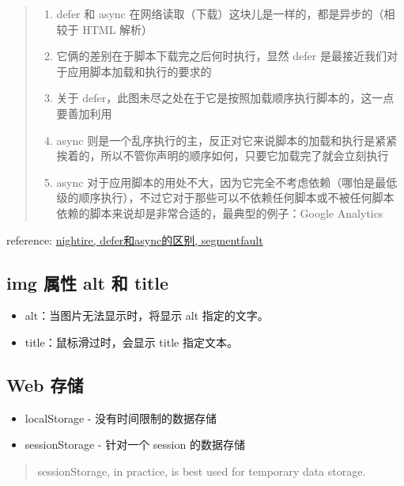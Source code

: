 \begin{quote}
\begin{enumerate}
\def\labelenumi{\arabic{enumi}.}
\tightlist
\item
  defer 和 async 在网络读取（下载）这块儿是一样的，都是异步的（相较于
  HTML 解析）
\item
  它俩的差别在于脚本下载完之后何时执行，显然 defer
  是最接近我们对于应用脚本加载和执行的要求的
\item
  关于
  defer，此图未尽之处在于它是按照加载顺序执行脚本的，这一点要善加利用
\item
  async
  则是一个乱序执行的主，反正对它来说脚本的加载和执行是紧紧挨着的，所以不管你声明的顺序如何，只要它加载完了就会立刻执行
\item
  async
  对于应用脚本的用处不大，因为它完全不考虑依赖（哪怕是最低级的顺序执行），不过它对于那些可以不依赖任何脚本或不被任何脚本依赖的脚本来说却是非常合适的，最典型的例子：Google
  Analytics
\end{enumerate}
\end{quote}

reference:
\href{http://segmentfault.com/q/1010000000640869/a-1020000000641029}{nightire,
defer和async的区别, segmentfault}

\subsection{img 属性 alt 和
title}\label{img-ux5c5eux6027-alt-ux548c-title}

\begin{itemize}
\tightlist
\item
  alt：当图片无法显示时，将显示 alt 指定的文字。
\item
  title：鼠标滑过时，会显示 title 指定文本。
\end{itemize}

\subsection{Web 存储}\label{web-ux5b58ux50a8}

\begin{itemize}
\tightlist
\item
  localStorage - 没有时间限制的数据存储
\item
  sessionStorage - 针对一个 session 的数据存储
\end{itemize}

\begin{quote}
sessionStorage, in practice, is best used for temporary data storage.
\end{quote}

